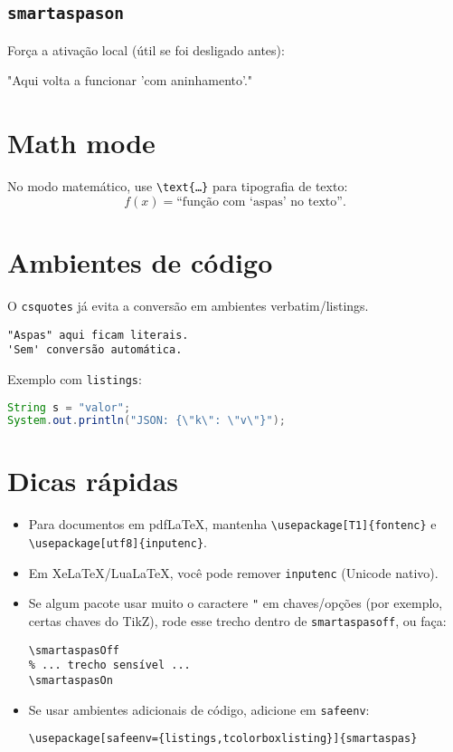 \documentclass[a4paper,12pt]{article}
\begin{document}
\subsection{\texttt{smartaspason}}
Força a ativa\c{c}\~ao local (\'util se foi desligado antes):
\smartaspasOff %
\begin{smartaspason}
"Aqui volta a funcionar 'com aninhamento'."
\end{smartaspason}
\smartaspasOn  %

\section{Math mode}
No modo matemático, use \verb|\text{…}| para tipografia de texto:
\[
f(x) = \text{“função com ‘aspas’ no texto”}.
\]

\section{Ambientes de c\'odigo}
O \texttt{csquotes} já evita a conversão em ambientes verbatim/listings.
\begin{verbatim}
"Aspas" aqui ficam literais.
'Sem' conversão automática.
\end{verbatim}

Exemplo com \texttt{listings}:
\begin{lstlisting}[language=Java]
String s = "valor";
System.out.println("JSON: {\"k\": \"v\"}");
\end{lstlisting}

\section{Dicas r\'apidas}
\begin{itemize}
  \item Para documentos em pdfLaTeX, mantenha \verb|\usepackage[T1]{fontenc}| e \verb|\usepackage[utf8]{inputenc}|.
  \item Em XeLaTeX/LuaLaTeX, você pode remover \verb|inputenc| (Unicode nativo).
  \item Se algum pacote usar muito o caractere \verb|"| em chaves/opções (por exemplo, certas chaves do TikZ), rode esse trecho dentro de \verb|smartaspasoff|, ou faça:
\begin{verbatim}
\smartaspasOff
% ... trecho sensível ...
\smartaspasOn
\end{verbatim}
  \item Se usar ambientes adicionais de código, adicione em \verb|safeenv|:
\begin{verbatim}
\usepackage[safeenv={listings,tcolorboxlisting}]{smartaspas}
\end{verbatim}
\end{itemize}
\end{document}

